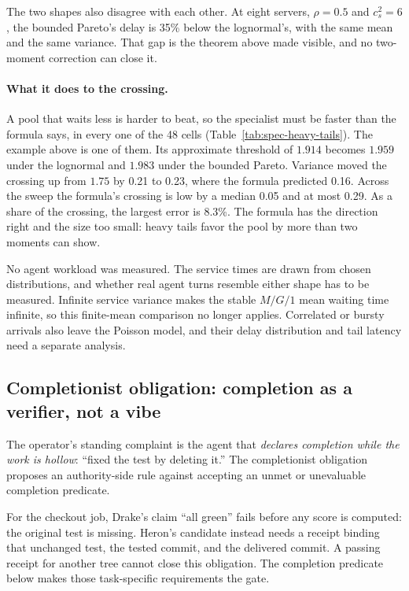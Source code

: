 \documentclass[11pt,a4paper]{article}
\theoremstyle{definition}
\theoremstyle{plain}
\begin{document}


The two shapes also disagree with each other. At eight servers, $\rho=0.5$
and $c_s^2=6$, the bounded Pareto's delay is 35\% below the lognormal's, with
the same mean and the same variance. That gap is the theorem above made
visible, and no two-moment correction can close it.

\paragraph{What it does to the crossing.} A pool that waits less is harder to
beat, so the specialist must be faster than the formula says, in every one of
the 48 cells (Table~\ref{tab:spec-heavy-tails}). The example above is one of
them. Its approximate threshold of $1.914$ becomes $1.959$ under the
lognormal and $1.983$ under the bounded Pareto. Variance moved the crossing
up from $1.75$ by 0.21 to 0.23, where the formula predicted 0.16. Across the
sweep the formula's crossing is low by a median 0.05 and at most 0.29. As a
share of the crossing, the largest error is 8.3\%. The formula has the
direction right and the size too small: heavy tails favor the pool by more
than two moments can show.



No agent workload was measured. The service times are drawn from chosen
distributions, and whether real agent turns resemble either shape has to be
measured. Infinite service variance makes the stable $M/G/1$ mean waiting
time infinite, so this finite-mean comparison no longer applies. Correlated
or bursty arrivals also leave the Poisson model, and their delay distribution
and tail latency need a separate analysis.

\subsection{Completionist obligation: completion as a verifier, not a vibe}\label{sec:completionist}

The operator's standing complaint is the agent that \emph{declares completion while
the work is hollow}: ``fixed the test by deleting it.'' The completionist
obligation proposes an authority-side rule against accepting an unmet or
unevaluable completion predicate.

For the checkout job, Drake's claim ``all green'' fails before any score is
computed: the original test is missing. Heron's candidate instead needs a receipt
binding that unchanged test, the tested commit, and the delivered commit.
A passing receipt for another tree cannot close this obligation. The completion
predicate below makes those task-specific requirements the gate.
\end{document}
